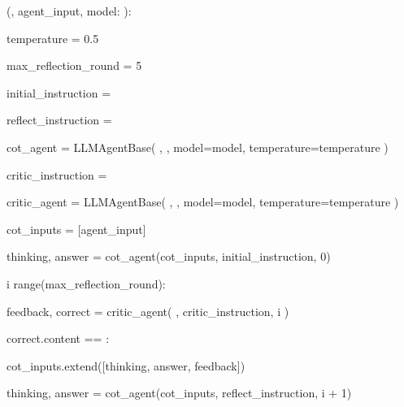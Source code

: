 \begin{subagent}[title=ReflexionAgent]
  (, agent\_input, model: ):

\quad {}

\quad temperature = 0.5

\quad max\_reflection\_round = 5

\quad {}

\quad initial\_instruction = 
\quad {}

\quad {}

\quad reflect\_instruction = 
\quad {}

\quad cot\_agent = LLMAgentBase(
\quad{},
\quad\quad {},
\quad\quad model=model,
\quad\quad temperature=temperature
\quad )

\quad {}

\quad critic\_instruction =
\quad {}

\quad critic\_agent = LLMAgentBase(
\quad{},
\quad\quad {},
\quad\quad model=model,
\quad\quad temperature=temperature
\quad )

\quad {}

\quad cot\_inputs = [agent\_input]

\quad thinking, answer = 
\quad {} cot\_agent(cot\_inputs, initial\_instruction, 0)

\quad {}

\quad {} i  range(max\_reflection\_round):

\quad\quad feedback, correct = 
\quad\quad {} critic\_agent(
\quad\quad{},
\quad\quad\quad critic\_instruction,
\quad\quad\quad i
\quad\quad )

\quad\quad {} correct.content == :

\quad\quad\quad {}

\quad\quad cot\_inputs.extend([thinking, answer, feedback])

\quad\quad thinking, answer =
\quad\quad {} cot\_agent(cot\_inputs, reflect\_instruction, i + 1)


\end{subagent}

